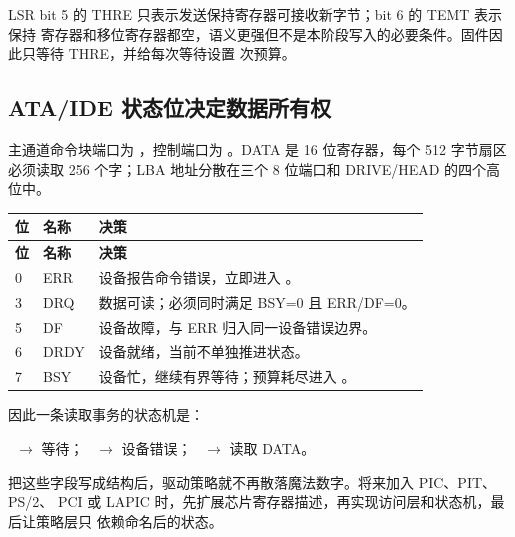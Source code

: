 LSR bit 5 的 THRE 只表示发送保持寄存器可接收新字节；bit 6 的 TEMT 表示保持
寄存器和移位寄存器都空，语义更强但不是本阶段写入的必要条件。固件因此只等待
THRE，并给每次等待设置  次预算。

\subsection{ATA/IDE 状态位决定数据所有权}

主通道命令块端口为 ，控制端口为 。DATA
是 16 位寄存器，每个 512 字节扇区必须读取 256 个字；LBA 地址分散在三个
8 位端口和 DRIVE/HEAD 的四个高位中。

\begin{longtable}{L{0.10\textwidth}L{0.18\textwidth}L{0.56\textwidth}}
\toprule
\textbf{位} & \textbf{名称} & \textbf{决策}\\
\midrule
\endfirsthead
\toprule
\textbf{位} & \textbf{名称} & \textbf{决策}\\
\midrule
{} & ERR & 设备报告命令错误，立即进入 。\\
3 & DRQ & 数据可读；必须同时满足 BSY=0 且 ERR/DF=0。\\
5 & DF & 设备故障，与 ERR 归入同一设备错误边界。\\
6 & DRDY & 设备就绪，当前不单独推进状态。\\
7 & BSY & 设备忙，继续有界等待；预算耗尽进入 。\\
\bottomrule
\end{longtable}

因此一条读取事务的状态机是：

\begin{center}
\ $\rightarrow$ 等待；\quad
{}\ $\rightarrow$ 设备错误；\quad
{}\ $\rightarrow$ 读取 DATA。
\end{center}

把这些字段写成结构后，驱动策略就不再散落魔法数字。将来加入 PIC、PIT、PS/2、
PCI 或 LAPIC 时，先扩展芯片寄存器描述，再实现访问层和状态机，最后让策略层只
依赖命名后的状态。
